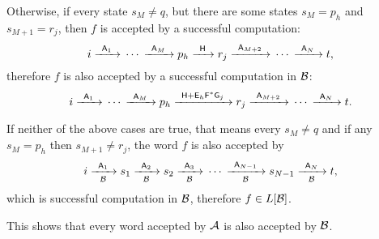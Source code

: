 Otherwise, if every state $s_M \neq q$, but there are some states $s_M = p_h$ and $s_{M+1} = r_j$, then $f$ is accepted by a successful computation:
\[
    i \tr{\re{A}_1} \dotsm \tr{\re{A}_M} p_h \tr{\re{H}} r_j \tr{\re{A}_{M+2}} \dotsm \tr{\re{A}_N} t,
\]
therefore $f$ is also accepted by a successful computation in $\aut{B}$:
\[
    i \tr{\re{A}_1} \dotsm \tr{\re{A}_M} p_h \tr{\re{H} + \re{E}_h\re{F}^*\re{G}_j} r_j \tr{\re{A}_{M+2}} \dotsm \tr{\re{A}_N} t.
\]

If neither of the above cases are true, that means every $s_M \neq q$ and if any $s_M = p_h$ then $s_{M+1} \neq r_j$, the word $f$ is also accepted by
\[
    i \tr[\aut{B}]{\re{A}_1} s_1 \tr[\aut{B}]{\re{A}_2} s_2 \tr[\aut{B}]{\re{A}_3} \dotsm \tr[\aut{B}]{\re{A}_{N-1}} s_{N-1} \tr[\aut{B}]{\re{A}_N} t,
\]
which is successful computation in $\aut{B}$, therefore $f \in L[\aut{B}]$.

This shows that every word accepted by $\aut{A}$ is also accepted by $\aut{B}$.